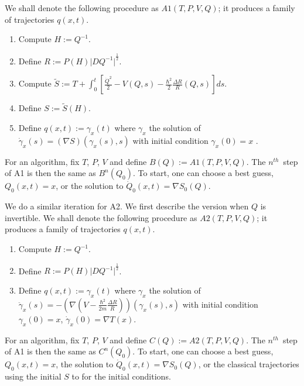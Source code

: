 \documentclass[11pt]{article}
\theoremstyle{remark}
\begin{document}
We shall denote the following procedure as $A1(T, P, V, Q)$; it
produces a family of trajectories $q(x, t)$.
\begin{enumerate}
\item Compute $H \ensuremath{:=} Q^{-1}$. 
\item Define $R \ensuremath{:=} P(H) \ensuremath{\lvert {DQ^{-1}} \rvert}^{\frac{1}{2}}$.
\item Compute $\tilde{S} \ensuremath{:=} T + \int_0^t [\frac{\dot{Q}^2}{2} -
V(Q,s) -  \frac{\ensuremath{\hbar}^2}{2}\frac{\ensuremath{\Delta} R}{R} (Q,s)] ds$.
\item Define $S \ensuremath{:=} \tilde{S} (H)$.
\item Define $q(x,t) \ensuremath{:=} \gamma_x(t)$ where $\gamma_x$ the solution of
$\dot{\gamma}_x (s) = (\nabla S)(\gamma_x(s), s)$ with initial condition
$\gamma_x(0) = x$ .  
\end{enumerate}
For an algorithm, fix $T$, $P$, $V$ and define $B(Q) \ensuremath{:=}
A1(T,P,V,Q)$. 
The \ensuremath{{n}^{th}}\ step of A1 is then the same as $B^n(Q_0)$. To start, one
can choose a best guess, $Q_0(x,t) = x$, or the solution to 
$\dot{Q}_0(x,t) =
\nabla S_0(Q)$.

We do a similar iteration for A2. We first describe the version when
$Q$ is invertible. 
We shall denote the following procedure as $A2(T, P, V, Q)$; it
produces a family of trajectories $q(x, t)$.
\begin{enumerate}
\item Compute $H \ensuremath{:=} Q^{-1}$. 
\item Define $R \ensuremath{:=} P(H) \ensuremath{\lvert {DQ^{-1}} \rvert}^{\frac{1}{2}}$.


\item Define $q(x,t) \ensuremath{:=} \gamma_x(t)$ where $\gamma_x$ the solution of
$\ddot{\gamma}_x (s) = -(\nabla (V  -  \frac{\ensuremath{\hbar}^2}{2m}\frac{\ensuremath{\Delta}
R}{R}) )(\gamma_x(s), s)$ with initial condition 
$\gamma_x(0) = x$, $\dot{\gamma}_x(0) = \nabla T (x)$.  
\end{enumerate}
For an algorithm, fix $T$, $P$, $V$ and define $C(Q) \ensuremath{:=}
A2(T,P,V,Q)$. 
The \ensuremath{{n}^{th}}\ step of A1 is then the same as $C^n(Q_0)$. To start, one
can choose a best guess, $Q_0(x,t) = x$, the solution to $\dot{Q}_0(x,t)=
\nabla S_0(Q)$, or the classical trajectories using the initial $S$ to
for the initial conditions. 
\end{document}
